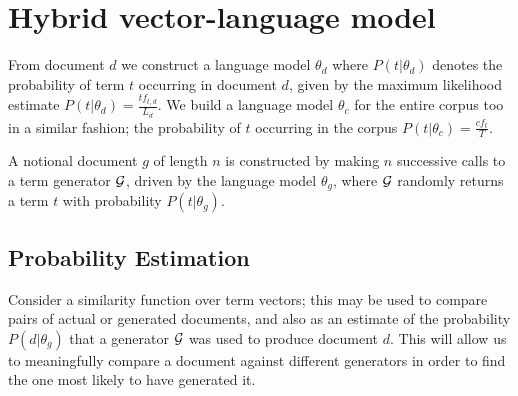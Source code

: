 \section{Hybrid vector-language model}
From document $d$ we construct a language model $\theta_d$ where $P(t|\theta_d)$ denotes the probability of term $t$ occurring in document $d$, given by the maximum likelihood estimate $P(t|\theta_d) = \frac{tf_{t, d}}{L_d}$. We build a language model $\theta_c$ for the entire corpus too in a similar fashion; the probability of $t$ occurring in the corpus $P(t|\theta_c) = \frac{cf_t}{T}$.

A notional document $g$ of length $n$ is constructed by making $n$ successive calls to a term generator $\mathcal{G}$, driven by the language model $\theta_g$, where $\mathcal{G}$ randomly returns a term $t$ with probability $P(t|\theta_g)$. 

\subsection{Probability Estimation}

Consider a similarity function over term vectors; this may be used to compare pairs of actual or generated documents, and also 
as an estimate of the probability $P(d|\theta_g)$ that a generator $\mathcal{G}$ was used to produce document $d$. This will allow us to meaningfully compare a document against different generators in order to find the one most likely to have generated it.

